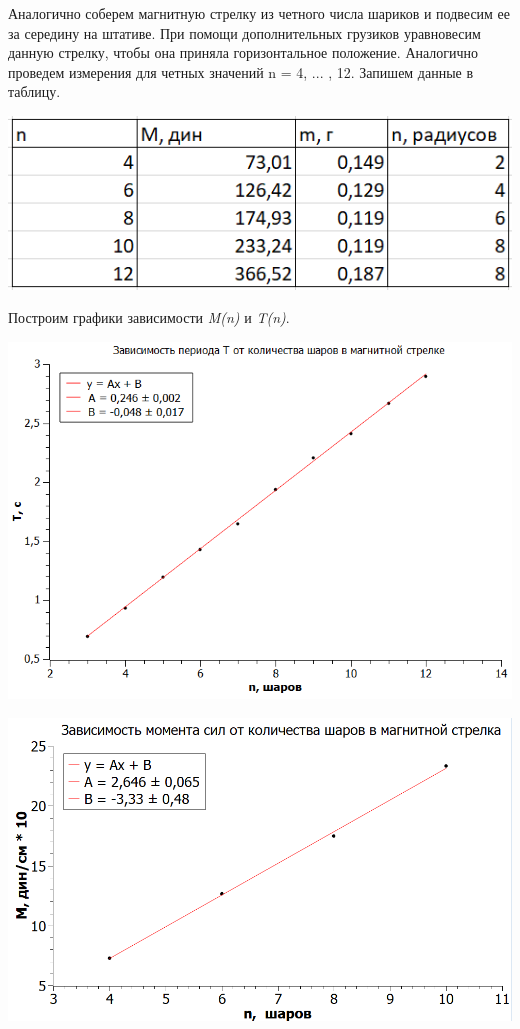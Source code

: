 \documentclass[a4paper,12pt]{article}
\begin{document}
\begin{enumerate}
Аналогично соберем магнитную стрелку из четного числа шариков и подвесим ее за середину на штативе. При помощи дополнительных грузиков уравновесим данную стрелку, чтобы она приняла горизонтальное положение. Аналогично проведем измерения для четных значений n = 4, ... , 12. Запишем данные в таблицу.

\begin{center}
\includegraphics[scale=0.8]{table2.png}
\end{center}

Построим графики зависимости \textit{M(n)} и \textit{T(n)}.

\begin{center}
\includegraphics[scale=0.8]{graph1.png}
\end{center}

\begin{center}
\includegraphics[scale=0.8]{graph2.png}
\end{center}


\end{enumerate}
\end{document}
